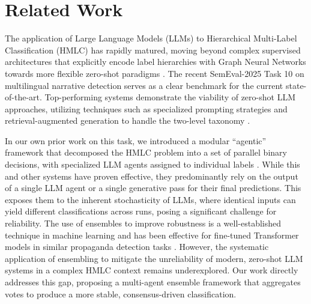 \section{Related Work}

The application of Large Language Models (LLMs) to Hierarchical Multi-Label Classification (HMLC) has rapidly matured, moving beyond complex supervised architectures that explicitly encode label hierarchies with Graph Neural Networks \citep{zhou-etal-2020-hierarchy} towards more flexible zero-shot paradigms \citep{wang-etal-2023-text2topic}. The recent SemEval-2025 Task 10 on multilingual narrative detection serves as a clear benchmark for the current state-of-the-art. Top-performing systems demonstrate the viability of zero-shot LLM approaches, utilizing techniques such as specialized prompting strategies and retrieval-augmented generation to handle the two-level taxonomy \citep{singh-etal-2025-gatenlp,younus-qureshi-2025-nlptuducd}.

In our own prior work on this task, we introduced a modular ``agentic'' framework that decomposed the HMLC problem into a set of parallel binary decisions, with specialized LLM agents assigned to individual labels \citep{eljadiri-nurbakova-2025-team}. While this and other systems have proven effective, they predominantly rely on the output of a single LLM agent or a single generative pass for their final predictions. This exposes them to the inherent stochasticity of LLMs, where identical inputs can yield different classifications across runs, posing a significant challenge for reliability. The use of ensembles to improve robustness is a well-established technique in machine learning \citep{Read2021} and has been effective for fine-tuned Transformer models in similar propaganda detection tasks \citep{jurkiewicz-etal-2020-applicaai}. However, the systematic application of ensembling to mitigate the unreliability of modern, zero-shot LLM systems in a complex HMLC context remains underexplored. Our work directly addresses this gap, proposing a multi-agent ensemble framework that aggregates votes to produce a more stable, consensus-driven classification.
